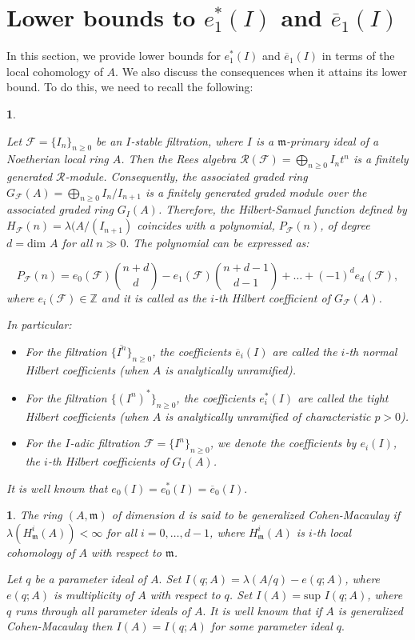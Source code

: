 \documentclass[11pt]{amsart}
\theoremstyle{plain}
\newtheorem{point}[theorem]{}
\newcommand{\m}{\mathfrak{m}}
\newcommand{\R}{\mathcal{R}}
\newcommand{\F}{\mathcal{F}}
\newcommand{\Z}{\mathbb{Z}}
\theoremstyle{plain}
\begin{document}
\section{Lower bounds to \texorpdfstring{$e^*_1(I)$}- and \texorpdfstring{$\overline{e}_1({I})$}-}
In this section, we provide lower bounds for $e^*_1(I)$ and $\overline{e}_1({I})$ in terms of the local cohomology of $A$. We also discuss the consequences when it attains its lower bound. To do this, we need to recall the following:


\begin{point}\label{HC}
    \normalfont

Let $\mathcal{F}=\{I_n\}_{n\geq 0}$ be an $I$-stable filtration, where $I$ is a $\m$-primary ideal of a Noetherian local ring $A$. Then the Rees algebra $\R(\mathcal{F})=\bigoplus_{n\geq 0}I_nt^n$ is a finitely generated $\R$-module. Consequently, the associated graded ring $G_{\mathcal{F}}(A)=\bigoplus_{n\geq 0}I_n/I_{n+1}$ is a finitely generated graded module over the associated graded ring $G_I(A)$. Therefore, the Hilbert-Samuel function defined by $H_{\mathcal{F}}(n)=\lambda(A/(I_{n+1})$ coincides with a polynomial, $P_{\mathcal{F}}(n)$, of degree $d=\text{dim }A$ for all $n\gg0.$ The polynomial can be expressed as:

$$P_{\mathcal{F}}(n)=e_0({\mathcal{F}})\binom{n+d}{d}-e_1({\mathcal{F}})\binom{n+d-1}{d-1}+\ldots +(-1)^de_d({\mathcal{F}}),$$
where $e_i({\mathcal{F}})\in \Z$ and it is called as the $i$-th Hilbert coefficient of $G_{\mathcal{F}}(A)$.

In particular:
\begin{itemize}
    \item[(1)] For the filtration $\{\overline{I^n}\}_{n\geq 0}$, the coefficients $\overline{e}_i(I)$ are called the {$i$-th normal Hilbert coefficients} (when $A$ is analytically unramified).
    \item[(2)] For the filtration $\{(I^n)^*\}_{n\geq 0}$, the coefficients $e_i^*(I)$ are called the {tight Hilbert coefficients} (when $A$ is analytically unramified of characteristic $p>0$).
    \item[(3)] For the $I$-adic filtration $\F=\{I^n\}_{n\geq 0}$, we denote the coefficients by $e_i(I)$, the {$i$-th Hilbert coefficients} of $G_I(A)$.
\end{itemize}
It is well known that $e_0(I)=e^*_0(I)=\overline{e}_0({I}).$

\end{point}
\begin{point}
\normalfont
    The ring $(A,\m)$ of dimension $d$ is said to be generalized Cohen-Macaulay if \\ $\lambda(H^i_{\m}(A))<\infty$ for all $i=0,\ldots ,d-1$, where $H^i_{\m}(A)$ is $i$-th local cohomology of $A$ with respect to $\m$.

    Let $q$ be a parameter ideal of $A.$ Set $I(q;A)=\lambda(A/q)-e(q;A)$, where $e(q;A)$ is multiplicity of $A$ with respect to $q$. Set $I(A)=\text{sup }I(q;A)$, where $q$ runs through all parameter ideals of $A.$ It is well known that if $A$ is generalized Cohen-Macaulay then $I(A)=I(q;A)$ for some parameter ideal $q.$
\end{point}
\end{document}
